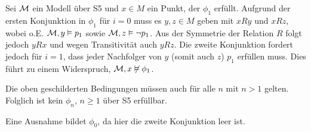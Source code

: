 Sei $\mathcal{M}$ ein Modell über S5 und $x \in M$ ein Punkt, der $\phi_1$ erfüllt. Aufgrund der ersten Konjunktion in
$\phi_1$ für $i = 0$ muss es $y, z \in M$ geben mit $xRy$ und $xRz$, wobei o.E. $\mathcal{M}, y \vDash p_1$ sowie
$\mathcal{M}, z \vDash \neg p_1$. Aus der Symmetrie der Relation $R$ folgt jedoch $yRx$ und wegen Transitivität auch
$yRz$. Die zweite Konjunktion fordert jedoch für $i = 1$, dass jeder Nachfolger von $y$ (somit auch $z$) $p_1$ erfüllen
muss. Dies führt zu einem Widerspruch, $\mathcal{M}, x \not\vDash \phi_1$.

Die oben geschilderten Bedingungen müssen auch für alle $n$ mit $n > 1$ gelten. Folglich ist kein $\phi_n$, $n \geq 1$ über
S5 erfüllbar.

Eine Ausnahme bildet $\phi_0$, da hier die zweite Konjunktion leer ist.


